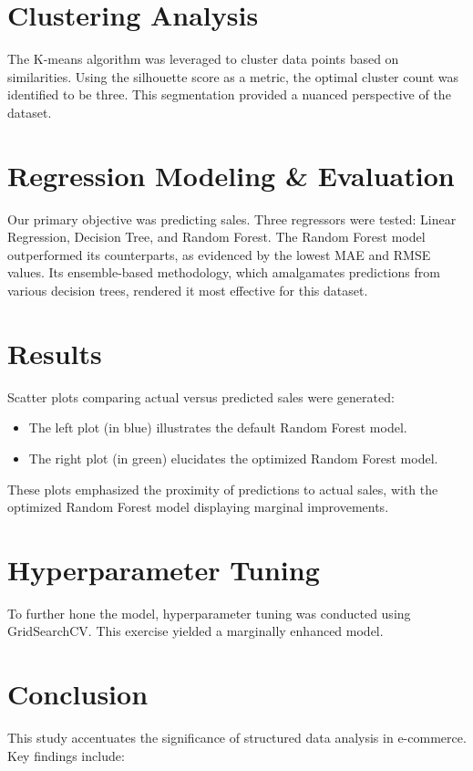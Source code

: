 \documentclass{article}
\begin{document}
\section{Clustering Analysis}
The K-means algorithm was leveraged to cluster data points based on similarities. Using the silhouette score as a metric, the optimal cluster count was identified to be three. This segmentation provided a nuanced perspective of the dataset.

\section{Regression Modeling \& Evaluation}
Our primary objective was predicting sales. Three regressors were tested: Linear Regression, Decision Tree, and Random Forest. The Random Forest model outperformed its counterparts, as evidenced by the lowest MAE and RMSE values. Its ensemble-based methodology, which amalgamates predictions from various decision trees, rendered it most effective for this dataset.

\section{Results}
Scatter plots comparing actual versus predicted sales were generated:

\begin{itemize}
    \item The left plot (in blue) illustrates the default Random Forest model.
    \item The right plot (in green) elucidates the optimized Random Forest model.
\end{itemize}

These plots emphasized the proximity of predictions to actual sales, with the optimized Random Forest model displaying marginal improvements.

\section{Hyperparameter Tuning}
To further hone the model, hyperparameter tuning was conducted using GridSearchCV. This exercise yielded a marginally enhanced model.

\section{Conclusion}
This study accentuates the significance of structured data analysis in e-commerce. Key findings include:
\end{document}
